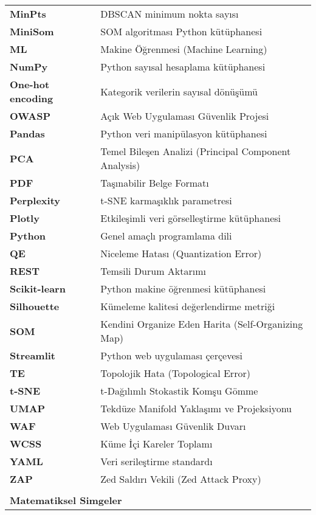 \begin{spacing}{1.0}
\begin{longtable}{@{}p{} p{}@{}}
\textbf{MinPts} & DBSCAN minimum nokta sayısı \\[1ex]
\textbf{MiniSom} & SOM algoritması Python kütüphanesi \\[1ex]
\textbf{ML}  &	Makine Öğrenmesi (Machine Learning) \\[1ex]
\textbf{NumPy} & Python sayısal hesaplama kütüphanesi \\[1ex]
\textbf{One-hot encoding} & Kategorik verilerin sayısal dönüşümü \\[1ex]
\textbf{OWASP}  &	Açık Web Uygulaması Güvenlik Projesi \\[1ex]
\textbf{Pandas} & Python veri manipülasyon kütüphanesi \\[1ex]
\textbf{PCA}  &	Temel Bileşen Analizi (Principal Component Analysis) \\[1ex]
\textbf{PDF}  &	Taşınabilir Belge Formatı \\[1ex]
\textbf{Perplexity} & t-SNE karmaşıklık parametresi \\[1ex]
\textbf{Plotly} & Etkileşimli veri görselleştirme kütüphanesi \\[1ex]
\textbf{Python} & Genel amaçlı programlama dili \\[1ex]
\textbf{QE} & Niceleme Hatası (Quantization Error) \\[1ex]
\textbf{REST}  &	Temsili Durum Aktarımı \\[1ex]
\textbf{Scikit-learn} & Python makine öğrenmesi kütüphanesi \\[1ex]
\textbf{Silhouette} & Kümeleme kalitesi değerlendirme metriği \\[1ex]
\textbf{SOM}  &	Kendini Organize Eden Harita (Self-Organizing Map) \\[1ex]
\textbf{Streamlit} & Python web uygulaması çerçevesi \\[1ex]
\textbf{TE} & Topolojik Hata (Topological Error) \\[1ex]
\textbf{t-SNE}  &	t-Dağılımlı Stokastik Komşu Gömme \\[1ex]
\textbf{UMAP}  &	Tekdüze Manifold Yaklaşımı ve Projeksiyonu \\[1ex]
\textbf{WAF}  &	Web Uygulaması Güvenlik Duvarı \\[1ex]
\textbf{WCSS}  &	Küme İçi Kareler Toplamı \\[1ex]
\textbf{YAML} & Veri serileştirme standardı \\[1ex]
\textbf{ZAP}  &	Zed Saldırı Vekili (Zed Attack Proxy) \\[2ex]
\\
\multicolumn{2}{l}{\textbf{Matematiksel Simgeler}} \\[1ex]

\end{longtable}
\end{spacing}
